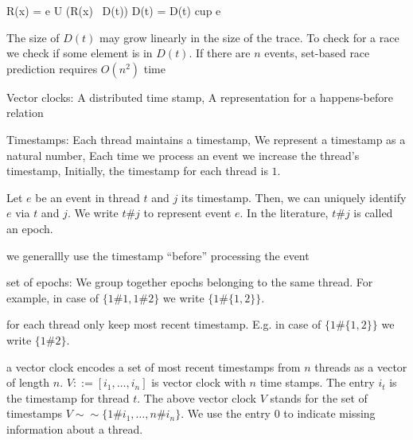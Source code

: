 \documentclass[landscape, a4paper]{article}
\begin{document}
\begin{minipage}[t]{0.2\linewidth}
\begin{betterlist}
\begin{betterlist}
\begin{betterlist}
\begin{betterlist}
{\begin{dnumberedcodebox}[minted language=text,minted options={autogobble, fontsize=\tiny,numbersep=0.3cm,linenos}, box align=top]
{                    R(x) = {e} U (R(x) \ D(t))
                    D(t) = D(t) cup { e }
                  }
                  \end{dnumberedcodebox}
					}
					\item {}
					\item The size of $D(t)$ may grow linearly in the size of the trace. To check for a race we check if some element is in $D(t)$. If there are $n$ events, set-based race prediction requires $O(n^2)$ time
				\end{betterlist}
			\end{betterlist}
			\item \alert{Vector clocks}: A distributed time stamp, A representation for a happens-before relation
			\begin{betterlist}
				\item \alert{Timestamps:} Each thread maintains a timestamp, We represent a timestamp as a natural number, Each time we process an event we increase the thread’s timestamp, Initially, the timestamp for each thread is $1$. 
				\begin{betterlist}
					\item Let $e$ be an event in thread $t$ and $j$ its timestamp. Then, we can uniquely identify $e$ via $t$ and $j$. We write $t\#j$ to represent event $e$. In the literature, $t\#j$ is called an \alert{epoch}. 
					\begin{betterlist}
						\item we generallly use the timestamp \enquote{before} processing the event
					\end{betterlist}
					\item \alert{set of epochs:} We group together epochs belonging to the same thread. For example, in case of $\{1\#1, 1\#2\}$ we write $\{1\#\{1, 2\}\}$. 
				\end{betterlist}
				\item for each thread only keep most recent timestamp. E.g. in case of $\{1\#\{1, 2\}\}$ we write $\{1\#2\}$. 
				\item a \alert{vector clock} encodes a set of most recent timestamps from $n$ threads as a vector of length $n$. $V ::= [i_1,\ldots ,i_n]$ is vector clock with $n$ time stamps. The entry $i_t$ is the timestamp for thread $t$. The above vector clock $V$ stands for the set of timestamps $V  \sim\sim  \{1\#i_1, \ldots, n\#i_n\}$. We use the entry $0$ to indicate missing information about a thread. 

\end{betterlist}
\end{betterlist}
\end{betterlist}
\end{minipage}
\end{document}
